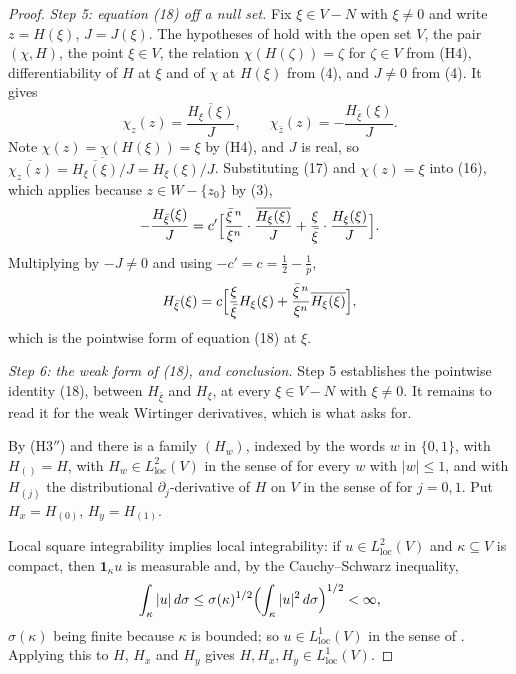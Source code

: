 \begin{proof}
\emph{Step 5: equation (18) off a null set.}  Fix $\xi\in V-N$ with
$\xi\neq0$ and write $z=H(\xi)$, $J=J(\xi)$.  The hypotheses of
 hold with the open set $V$, the pair $(\chi,H)$, the
point $\xi\in V$, the relation $\chi(H(\zeta))=\zeta$ for $\zeta\in V$ from
(H4), differentiability of $H$ at $\xi$ and of $\chi$ at $H(\xi)$ from (4),
and $J\neq0$ from (4).  It gives
\begin{equation}\tag{17}
  \chi_z(z)=\frac{\overline{H_\xi(\xi)}}{J},\qquad
  \chi_{\bar z}(z)=-\frac{H_{\bar\xi}(\xi)}{J}.
\end{equation}
Note $\chi(z)=\chi(H(\xi))=\xi$ by (H4), and $J$ is real, so
$\overline{\chi_z(z)}=\overline{\overline{H_\xi(\xi)}/J}=H_\xi(\xi)/J$.
Substituting (17) and $\chi(z)=\xi$ into (16), which applies because
$z\in W-\{z_0\}$ by (3),
\[
  -\frac{H_{\bar\xi}(\xi)}{J}
  =c'\Bigl[\frac{\bar\xi^{\,n}}{\xi^{n}}\cdot\frac{\overline{H_\xi(\xi)}}{J}
    +\frac{\xi}{\bar\xi}\cdot\frac{H_\xi(\xi)}{J}\Bigr].
\]
Multiplying by $-J\neq0$ and using $-c'=c=\tfrac12-\tfrac1p$,
\[
  H_{\bar\xi}(\xi)
  =c\Bigl[\frac{\xi}{\bar\xi}H_\xi(\xi)
    +\frac{\bar\xi^{\,n}}{\xi^{n}}\overline{H_\xi(\xi)}\Bigr],
\]
which is the pointwise form of equation (18) at $\xi$.

\emph{Step 6: the weak form of (18), and conclusion.}  Step 5 establishes the
pointwise identity (18), between $H_{\bar\xi}$ and $H_\xi$, at every
$\xi\in V-N$ with $\xi\neq0$.  It remains to read it for the weak Wirtinger
derivatives, which is what  asks for.

By (H3$''$) and  there is a family $(H_w)$, indexed by the
words $w$ in $\{0,1\}$, with $H_{()}=H$, with $H_w\in L^2_{\mathrm{loc}}(V)$ in
the sense of  for every $w$ with $|w|\le1$, and with
$H_{(j)}$ the distributional $\partial_j$-derivative of $H$ on $V$ in the sense
of  for $j=0,1$.  Put $H_x=H_{(0)}$, $H_y=H_{(1)}$.

Local square integrability implies local integrability: if
$u\in L^2_{\mathrm{loc}}(V)$ and $\kappa\subseteq V$ is compact, then
$\mathbf{1}_\kappa u$ is measurable and, by the Cauchy--Schwarz inequality,
\[
  \int_\kappa|u|\,d\sigma
  \le\sigma(\kappa)^{1/2}\Bigl(\int_\kappa|u|^2\,d\sigma\Bigr)^{1/2}<\infty,
\]
$\sigma(\kappa)$ being finite because $\kappa$ is bounded; so
$u\in L^1_{\mathrm{loc}}(V)$ in the sense of .  Applying
this to $H$, $H_x$ and $H_y$ gives $H,H_x,H_y\in L^1_{\mathrm{loc}}(V)$.


\end{proof}
